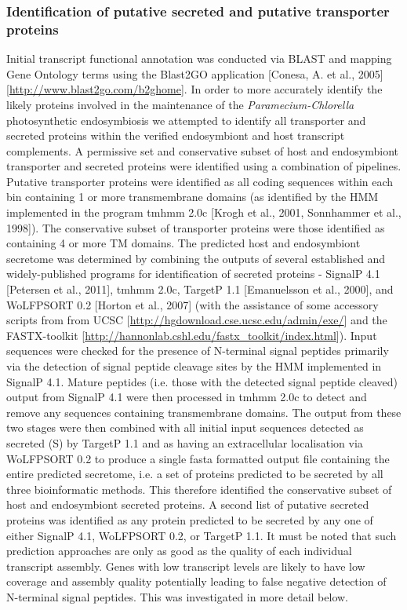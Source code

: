\subsubsection{Identification of putative secreted and putative transporter proteins}
Initial transcript functional annotation was conducted via BLAST and mapping Gene Ontology terms using the Blast2GO application [Conesa, A. et al., 2005] [\url{http://www.blast2go.com/b2ghome}].  
In order to more accurately identify the likely proteins involved in the maintenance of the \textit{Paramecium-Chlorella} photosynthetic endosymbiosis we attempted to identify all transporter and secreted proteins within the verified endosymbiont and host transcript complements. A permissive set and conservative subset of host and endosymbiont transporter and secreted proteins were identified using a combination of pipelines.
 Putative transporter proteins were identified as all coding sequences within each bin containing 1 or more transmembrane domains (as identified by the HMM implemented in the program tmhmm 2.0c  [Krogh et al., 2001, Sonnhammer et al., 1998]).  
The conservative subset of transporter proteins were those identified as containing 4 or more TM domains.  
The predicted host and endosymbiont secretome was determined by combining the outputs of several established and widely-published programs for identification of secreted proteins - SignalP 4.1 [Petersen et al., 2011], tmhmm 2.0c, TargetP 1.1 [Emanuelsson et al., 2000], and WoLFPSORT 0.2 [Horton et al., 2007] (with the assistance of some accessory scripts from from UCSC [\url{http://hgdownload.cse.ucsc.edu/admin/exe/}] and the FASTX-toolkit [\url{http://hannonlab.cshl.edu/fastx_toolkit/index.html}]). 
Input sequences were checked for the presence of N-terminal signal peptides primarily via the detection of signal peptide cleavage sites by the HMM implemented in SignalP 4.1. 
Mature peptides (i.e. those with the detected signal peptide cleaved) output from SignalP 4.1 were then processed in tmhmm 2.0c to detect and remove any sequences containing transmembrane domains. 
The output from these two stages were then combined with all initial input sequences detected as secreted (S) by TargetP 1.1 and as having an extracellular localisation via WoLFPSORT 0.2 to produce a single fasta formatted output file containing the entire predicted secretome, i.e. a set of proteins predicted to be secreted by all three bioinformatic methods. 
This therefore identified the conservative subset of host and endosymbiont secreted proteins. 
A second list of putative secreted proteins was identified as any protein predicted to be secreted by any one of either SignalP 4.1, WoLFPSORT 0.2, or TargetP 1.1. It must be noted that such prediction approaches are only as good as the quality of each individual transcript assembly. 
Genes with low transcript levels are likely to have low coverage and assembly quality potentially leading to false negative detection of N-terminal signal peptides. 
This was investigated in more detail below.

